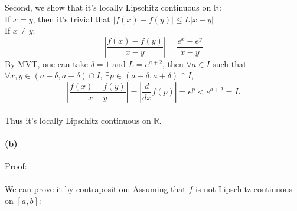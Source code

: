 \documentclass{article}
\begin{document}
Second, we show that it's locally Lipschitz continuous on $\mathbb{R}$:\\
If $x=y$, then it's trivial that $|f(x)-f(y)|\leq L|x-y|$\\
If $x\neq y$:
$$\left|\frac{f(x)-f(y)}{x-y}\right|=\frac{e^x-e^y}{x-y}$$
By MVT, one can take $\delta =1$ and $L=e^{a+2}$, then $\forall a\in I$ such that $\forall x,y\in (a-\delta,a+\delta)\cap I$, $\exists p\in (a-\delta,a+\delta)\cap I$,
$$\left|\frac{f(x)-f(y)}{x-y}\right|=\left|
\frac{d}{dx}f(p)\right|=e^p<e^{a+2}=L$$\\
Thus it's locally Lipschitz continuous on $\mathbb{R}$.

\paragraph{(b)} Proof:
\\\\
We can prove it by contraposition:
Assuming that $f$ is not Lipschitz continuous on $[a,b]$:
\end{document}
